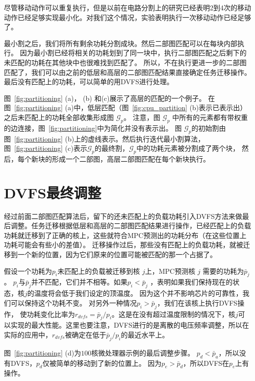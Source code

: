 尽管移动动作可以重复执行，但是以前在电路分割上的研究已经表明2到4次的移动动作已经足够实现最小化。对我们这个情况，实验表明执行一次移动动作已经足够了。

最小割之后，我们将所有剩余功耗分割成块。然后二部图匹配可以在每块内部执行。
因为最小割已经将相关的功耗划到了同一块中，执行二部图匹配之后剩下的未匹配的功耗在其他块中也很难找到匹配了。
所以，不在执行更进一步的二部图匹配了，我们可以由之前的低层和高层的二部图匹配结果直接确定任务迁移操作。
最后没有匹配上的功耗，可以简单的用DVFS进行处理。

图~\ref{fig:partitioning} (a)， (b) 和(c)展示了高层的匹配的一个例子。
在图~\ref{fig:partitioning} (a)中，低层匹配（图~\ref{fig:cpu_partition} (b)表示已表示出）之后未匹配上的功耗全部收集形成图 $\mathcal{G}_p$。
注意，图 $\mathcal{G}_p$ 中所有的元素都有带权重的边连接，图~\ref{fig:partitioning}中为简化并没有表示出。
图 $\mathcal{G}_p$的初始割由图~\ref{fig:partitioning} (b)上的虚线表示。然后执行迭代最小割算法，
图~\ref{fig:partitioning} (c)表示$\mathcal{G}_p$的最终割，$\mathcal{G}_p$中的功耗元素被分割成了两个块，
然后，每个新块的形成一个二部图，高层二部图匹配在每个新块执行。


\section{DVFS最终调整}\label{sec:dvfs_adj}

经过前面二部图匹配算法后，留下的还未匹配上的负载功耗引入DVFS方法来做最后调整。任务迁移根据低层和高层的二部图匹配结果进行操作，已经匹配上的负载功耗就迁移到了正确的核上，这些就符合MPC预测出的功耗分布（在这些位置上功耗可能会有些小的差值）。
迁移操作过后，那些没有匹配上的负载功耗，就被迁移到一个新的位置，因为它们原来的位置可能被匹配的那一个占据了。

假设一个功耗为$p_i$未匹配上的负载被迁移到核 $j$上，MPC预测核 $j$ 需要的功耗为$\bar{p}_j$。
$p_i$与$\bar{p}_j$并不匹配，它们并不相等。如果$p_i < \bar{p}_j$ ，表明如果我们保持现在的状态，核$j$的温度将会低于我们设定的顶温度。
因为这个并不影响芯片的可靠性，我们可以保持这个功耗不变。
对另外一种情况$p_i > \bar{p}_j$，我们在该核上执行DVFS操作，
使功耗变化比率为$r_{dvfs} = \bar{p}_j/p_i$。这是在没有超过温度限制的情况下，核$j$可以实现的最大性能。这里也要注意，DVFS进行的是离散的电压频率调整，所以在实际的应用中，$r_{dvfs}$被确定在低于$\bar{p}_j/p_i$的最近水平上。

图~\ref{fig:partitioning} (d)为$100$核微处理器示例的最后调整步骤。
$p_d < \bar{p}_a$，所以没有DVFS，$p_d$仅被简单的移动到了新的位置上。
因为$p_e>\bar{p}_d$，所以DVFS在$p_e$上有操作。

